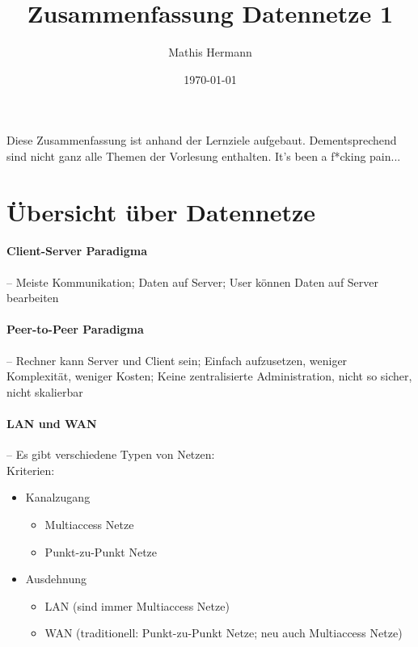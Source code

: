 \documentclass[a4paper,12pt]{article}
\begin{document}
\title{Zusammenfassung Datennetze 1}
\author{Mathis Hermann}
\date{\today}
\maketitle
Diese Zusammenfassung ist anhand der Lernziele aufgebaut. Dementsprechend sind nicht ganz alle Themen der Vorlesung enthalten. It's been a f*cking pain...

\section{Übersicht über Datennetze}



\paragraph{Client-Server Paradigma} -- Meiste Kommunikation; Daten auf Server; User können Daten auf Server bearbeiten

\paragraph{Peer-to-Peer Paradigma} -- Rechner kann Server und Client sein; Einfach aufzusetzen, weniger Komplexität, weniger Kosten; Keine zentralisierte Administration, nicht so sicher, nicht skalierbar

\paragraph{LAN und WAN} -- Es gibt verschiedene Typen von Netzen:\\
Kriterien:
\begin{itemize}
\item Kanalzugang
\begin{itemize}
\item Multiaccess Netze
\item Punkt-zu-Punkt Netze
\end{itemize}
\item Ausdehnung
\begin{itemize}
\item LAN (sind immer Multiaccess Netze)
\item WAN (traditionell: Punkt-zu-Punkt Netze; neu auch Multiaccess Netze)
\end{itemize}
\end{itemize}
\end{document}
